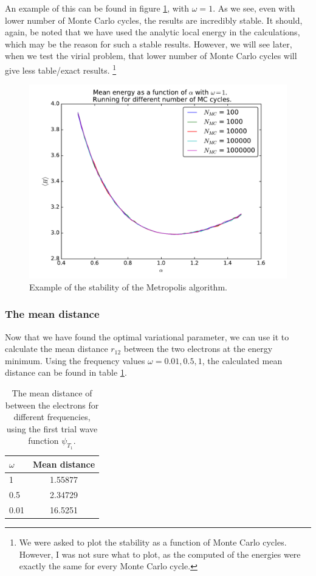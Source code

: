 \documentclass[12pt]{article}
\begin{document}
An example of this can be found in figure \ref{fig:Stability_1}, with $\omega = 1$. As we see, even with lower number of Monte Carlo cycles, the results are incredibly stable. It should, again, be noted that we have used the analytic local energy in the calculations, which may be the reason for such a stable results. However, we will see later, when we test the virial problem, that lower number of Monte Carlo cycles will give less table/exact results. \footnote{We were asked to plot the stability as a function of Monte Carlo cycles. However, I was not sure what to plot, as the computed of the energies were exactly the same for every Monte Carlo cycle.}
\begin{figure}[h]
\centering
\includegraphics[width=\linewidth]{Plots/Stability_check.pdf}
\caption{Example of the stability of the Metropolis algorithm.}
\label{fig:Stability_1}
\end{figure}

\FloatBarrier
\subsubsection{The mean distance}
Now that we have found the optimal variational parameter, we can use it to calculate the mean distance $r_{12}$ between the two electrons at the energy minimum. Using the frequency values $\omega = 0.01, 0.5, 1$, the calculated mean distance  can be found in table \ref{table:Mean_Distance}.
\begin{table}
\begin{center}
	\begin{tabular}{| l | c |}
	\hline 
	$\omega$ & Mean distance \\ \hline
	1 & 1.55877 \\ 
	0.5 & 2.34729 \\
	0.01 & 16.5251 \\ \hline
	\end{tabular}
\caption{The mean distance of between the electrons for different frequencies, using the first trial wave function $\psi_{T_1}$.}
\label{table:Mean_Distance}
\end{center}
\end{table}
\end{document}
